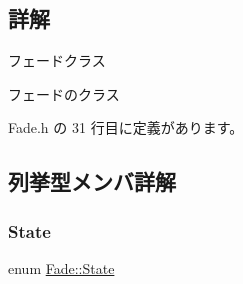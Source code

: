 \subsection{詳解}
フェードクラス 

フェードのクラス 

 Fade.\+h の 31 行目に定義があります。



\subsection{列挙型メンバ詳解}
\mbox{\label{class_fade_ae77826bf3ff2ab95fb7b3b6f95cba80a}} 
\subsubsection{\texorpdfstring{State}{State}}
{\footnotesize\ttfamily enum \mbox{\hyperlink{class_fade_ae77826bf3ff2ab95fb7b3b6f95cba80a}{Fade\+::\+State}}}

